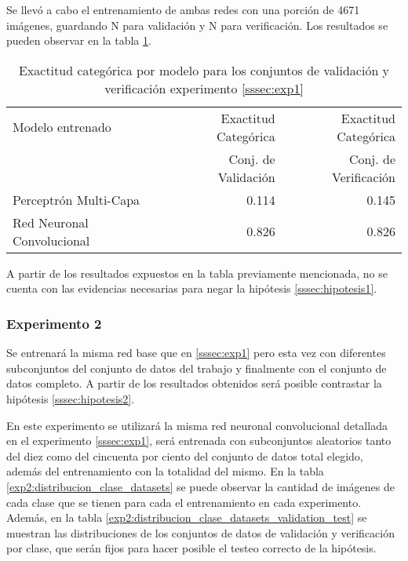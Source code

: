 Se llevó a cabo el entrenamiento de ambas redes con una porción de 4671 imágenes, guardando N para validación y N para verificación. Los resultados se pueden observar en la tabla \ref{exp1:results}.

\begin{table}[h!]
	\centering
	\begin{tabular}{| l | r | r |}
		\toprule
		Modelo entrenado & Exactitud Categórica &  Exactitud Categórica \\
		{} & Conj. de Validación &  Conj. de Verificación \\
		\midrule
		Perceptrón Multi-Capa & 0.114 & 0.145 \\
		Red Neuronal Convolucional & 0.826 & 0.826\\
		\bottomrule
	\end{tabular}
	\caption{Exactitud categórica por modelo para los conjuntos de validación y verificación experimento \ref{sssec:exp1}}
	\label{exp1:results}
\end{table}



A partir de los resultados expuestos en la tabla previamente mencionada, no se cuenta con las evidencias necesarias para negar la hipótesis \ref{sssec:hipotesis1}. 

\subsubsection{Experimento 2} \label{sssec:exp2}
Se entrenará la misma red base que en \ref{sssec:exp1} pero esta vez con diferentes subconjuntos del conjunto de datos del trabajo \cite{lstm_real_estate} y finalmente con el conjunto de datos completo. A partir de los resultados obtenidos será posible contrastar la hipótesis \ref{sssec:hipotesis2}.

En este experimento se utilizará la misma red neuronal convolucional detallada en el experimento \ref{sssec:exp1}, será entrenada con subconjuntos aleatorios tanto del diez como del cincuenta por ciento del conjunto de datos total elegido, además del entrenamiento con la totalidad del mismo. En la tabla \ref{exp2:distribucion_clase_datasets} se puede observar la cantidad de imágenes de cada clase que se tienen para cada el entrenamiento en cada experimento. Además, en la tabla \ref{exp2:distribucion_clase_datasets_validation_test} se muestran las distribuciones de los conjuntos de datos de validación y verificación por clase, que serán fijos para hacer posible el testeo correcto de la hipótesis.

